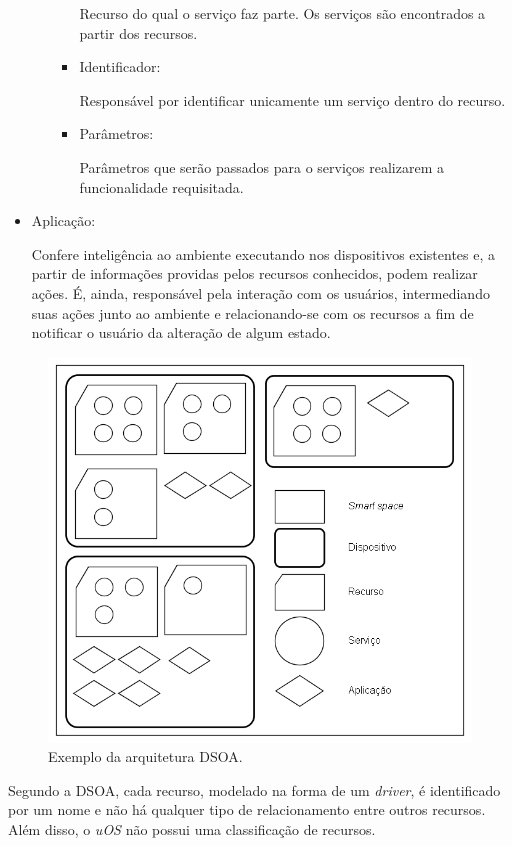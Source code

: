 \begin{itemize}
\begin{itemize}
\begin{itemize}
					Recurso do qual o serviço faz parte. Os serviços são encontrados a partir dos recursos.
				\item Identificador:

					Responsável por identificar unicamente um serviço dentro do recurso.
				\item Parâmetros:

					Parâmetros que serão passados para o serviços realizarem a funcionalidade requisitada.
			\end{itemize}
		\end{itemize}
	\item Aplicação:
	
		Confere inteligência ao ambiente executando nos dispositivos existentes e, a partir de informações providas pelos recursos conhecidos, podem realizar ações. É, ainda, responsável pela interação com os usuários, intermediando suas ações junto ao ambiente e relacionando-se com os recursos a fim de notificar o usuário da alteração de algum estado.
\end{itemize}

\begin{figure}[ht]
	\center
	\includegraphics[scale=0.6]{imagens/arquiteturaDSOA}
	\caption{Exemplo da arquitetura DSOA.}
	\label{fig:arquiteturaDSOA}
\end{figure}

Segundo a DSOA, cada recurso, modelado na forma de um \emph{driver}, é identificado por um nome e não há qualquer tipo de relacionamento entre outros recursos. Além disso, o \emph{uOS} não possui uma classificação de recursos. 